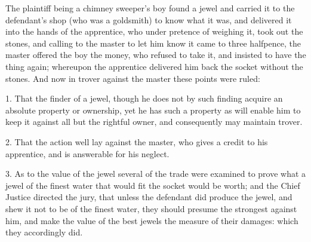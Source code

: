 
The plaintiff being a chimney sweeper's boy found a jewel and carried it to the
defendant's shop (who was a goldsmith) to know what it was, and delivered it
into the hands of the apprentice, who under pretence of weighing it, took out
the stones, and calling to the master to let him know it came to three
halfpence, the master offered the boy the money, who refused to take it, and
insisted to have the thing again; whereupon the apprentice delivered him back
the socket without the stones. And now in trover against the master these
points were ruled: 

1. That the finder of a jewel, though he does not by such finding acquire an
absolute property or ownership, yet he has such a property as will enable him
to keep it against all but the rightful owner, and consequently may maintain
trover. 

2. That the action well lay against the master, who gives a credit to his
apprentice, and is answerable for his neglect. 

3. As to the value of the jewel several of the trade were examined to prove what
a jewel of the finest water that would fit the socket would be worth; and the
Chief Justice directed the jury, that unless the defendant did produce the
jewel, and shew it not to be of the finest water, they should presume the
strongest against him, and make the value of the best jewels the measure of
their damages: which they accordingly did. 

